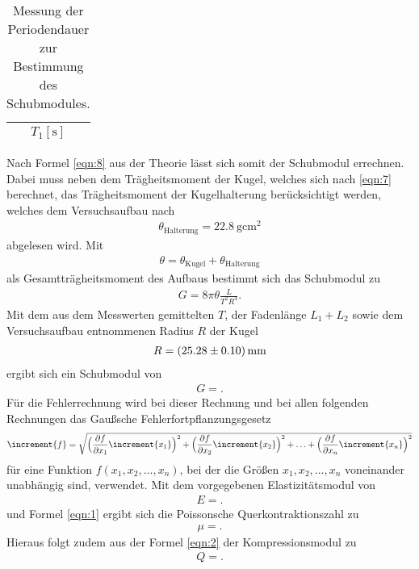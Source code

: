 \begin{table}[H]
  \centering
  \caption{Messung der Periodendauer zur Bestimmung des Schubmodules.}
  \label{tab:3}
  \begin{tabular}{c}
    \toprule
    {$T_1 [\si{\second}]$}\\
    \midrule
    
    \bottomrule
  \end{tabular}
\end{table}

Nach Formel \eqref{eqn:8} aus der Theorie lässt sich somit der Schubmodul errechnen.
Dabei muss neben dem Trägheitsmoment der Kugel, welches sich nach \eqref{eqn:7} berechnet, das Trägheitsmoment der Kugelhalterung berücksichtigt werden, welches dem Versuchsaufbau nach
\begin{align*}
  \theta_{\text{Halterung}} = \SI{22.8}{\gram\centi\metre\squared}
\end{align*}
abgelesen wird.
Mit
\begin{align*}
  \theta = \theta_{\text{Kugel}} + \theta_{\text{Halterung}}
\end{align*}
als Gesamtträgheitsmoment des Aufbaus bestimmt sich das Schubmodul zu
\begin{align*}
  G = 8 \pi \theta \frac{L}{T^2 R^4}.
\end{align*}
Mit dem aus dem Messwerten gemittelten $T$, der Fadenlänge $L_1 + L_2$ sowie dem Versuchsaufbau entnommenen Radius $R$ der Kugel
\begin{align*}
  R = \SI{25.28 +- 0.1}{\milli\metre}
\end{align*}
ergibt sich ein Schubmodul von
\begin{align*}
  G = .
\end{align*}
Für die Fehlerrechnung wird bei dieser Rechnung und bei allen folgenden Rechnungen das Gaußsche Fehlerfortpflanzungsgesetz
\begin{equation}
\increment{f} = \sqrt{\Bigl(\frac{\partial f}{\partial x_1}\increment{x_1}\Bigr)^2 + \Bigl(\frac{\partial f}{\partial x_2}\increment{x_2}\Bigr)^2 + \dotsc + \Bigl(\frac{\partial f}{\partial x_n}\increment{x_n}\Bigr)^2}
\end{equation}
für eine Funktion $f(x_1,x_2, \dotsc ,x_n)$, bei der die Größen $x_1, x_2, \dotsc , x_n$ voneinander unabhängig sind, verwendet.
Mit dem vorgegebenen Elastizitätsmodul von
\begin{align*}
  E = .
\end{align*}
und Formel \eqref{eqn:1} ergibt sich die Poissonsche Querkontraktionszahl zu
\begin{align*}
  \mu = .
\end{align*}
Hieraus folgt zudem aus der Formel \eqref{eqn:2} der Kompressionsmodul zu
\begin{align*}
  Q = .
\end{align*}

